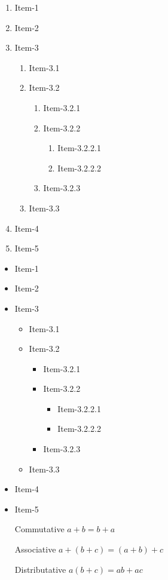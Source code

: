 \documentclass[11pt]{article}
\begin{document}
\begin{enumerate}
\item Item-1
\item Item-2
\item Item-3
	\begin{enumerate}
	\item Item-3.1
	\item Item-3.2
		\begin{enumerate}
		\item Item-3.2.1
		\item Item-3.2.2
			\begin{enumerate}
			\item Item-3.2.2.1
			\item Item-3.2.2.2
			\end{enumerate}
		\item Item-3.2.3
		\end{enumerate}
	\item Item-3.3
	\end{enumerate}
\item Item-4
\item Item-5
\end{enumerate}


\begin{itemize}
\item Item-1
\item Item-2
\item Item-3
	\begin{itemize}
	\item Item-3.1
	\item Item-3.2
		\begin{itemize}
		\item Item-3.2.1
		\item Item-3.2.2
			\begin{itemize}
			\item Item-3.2.2.1
			\item Item-3.2.2.2
			\end{itemize}
		\item Item-3.2.3
		\end{itemize}
	\item Item-3.3
	\end{itemize}
\item Item-4
\item Item-5
\end{itemize}

\begin{enumerate}
\item[Commutative] $a + b = b + a$
\item[Associative] $a + (b + c) = (a + b) + c$
\item[Distributative] $a(b + c) = ab + ac$
\end{enumerate}
\end{document}
